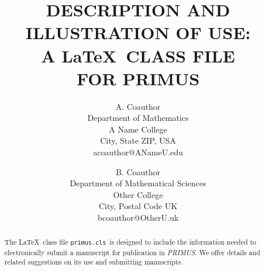\documentclass{primus}
\title{DESCRIPTION AND \\ILLUSTRATION OF USE: \\A \LaTeX\ CLASS FILE \\FOR PRIMUS}
\author{A. Coauthor\\
Department of Mathematics\\
A Name College\\
City, State ZIP, USA\\
acoauthor@ANameU.edu
\and
B. Coauthor\\
Department of Mathematical Sciences\\
Other College\\
City, Postal Code UK\\
bcoauthor@OtherU.uk
}
\newcommand{\pcls}{{\tt primus.cls}}
\newcommand{\PR}{{\it PRIMUS}}
\begin{document}

\makePtitlepage
\makePtitle

\begin{abstract}
The \LaTeX\ class file \pcls\ is designed to include the information
needed to electronically submit a manuscript for publication in \PR. We offer details and related suggestions on its use and submitting manuscripts.
\end{abstract}

\listkeywords

%
%
%
% 
%
%
%
\end{document}
